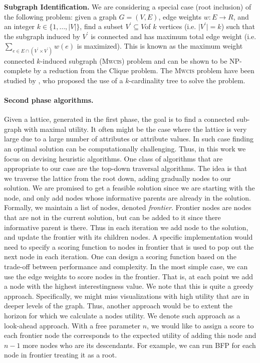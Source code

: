 \textbf{Subgraph Identification.} We are considering a special case (root inclusion) of the following problem: given a graph $G=(V,E)$, edge weights $w:E\rightarrow R$, and an integer $k\in\{1,\ldots,\lvert V\rvert\}$, find a subset $V^\prime \subseteq V $of $k$ vertices (i.e. $\lvert V^\prime\rvert = k$) such that the subgraph induced by $V^\prime$  is connected and has maximum total edge weight (i.e. $\sum_{e\in E\cap(V^\prime\times V^\prime)}w(e)$ is maximized). This is known as the maximum weight connected $k$-induced subgraph (\textsc{Mwcis}) problem and can be shown to be NP-complete by a reduction from the Clique problem. The \textsc{Mwcis} problem have been studied by \cite{ErnstAlthaus2009}, who proposed the use of a $k$-cardinality tree to solve the problem.


\paragraph{Second phase algorithms.} Given a lattice, generated in the first phase, the goal is to find a connected sub-graph with maximal utility. It often might be the case where the lattice is very large due to a large number of attributes or attribute values. In such case finding an optimal solution can be computationally challenging. Thus, in this work we focus on devising heuristic algorithms. One class of algorithms that are appropriate to our case are the top-down traversal algorithms. The idea is that we traverse the lattice from the root down, adding gradually nodes to our solution. We are promised to get a feasible solution since we are starting with the node, and only add nodes whose informative parents are already in the solution. Formally, we maintain a list of nodes, denoted \textit{frontier}. Frontier nodes are nodes that are not in the current solution, but can be added to it since there informative parent is there. Thus in each iteration we add node to the solution, and update the frontier with its children nodes. A specific implementation would need to specify a scoring function to nodes in frontier that is used to pop out the next node in each iteration.
One can design a scoring function based on the trade-off between performance and complexity. In the most simple case, we can use the edge weights to score nodes in the frontier. That is, at each point we add a node with the highest interestingness value. We note that this is quite a greedy approach. Specifically, we might miss visualizations with high utility that are in deeper levels of the graph. Thus, another approach would be to extent the horizon for which we calculate a nodes utility. We denote such approach as a look-ahead approach. With a free parameter $n$, we would like to assign a score to each frontier node the corresponds to the expected utility of adding this node and $n-1$ more nodes who are its descendants. For example, we can run BFP for each node in frontier treating it as a root. 

